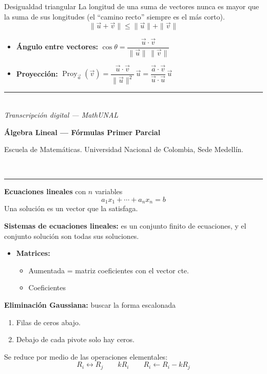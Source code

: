 \documentclass[11pt]{article}
\newcommand{\examheader}{%
  \noindent
  \begin{minipage}[t]{0.6\linewidth}
    {\small\bfseries Álgebra Lineal --- Fórmulas Primer Parcial}\\
  \end{minipage}%
  \hfill
  \begin{minipage}[t]{0.35\linewidth}
    \raggedleft\small Escuela de Matemáticas. Universidad Nacional de Colombia, Sede Medellín.
  \end{minipage}\\[2pt]
  \rule{\linewidth}{0.6pt}
}
\newcommand{\examfooter}{%
  \vfill
  \rule{\linewidth}{0.4pt}\\[1pt]
  {\scriptsize\textit{Transcripción digital --- MathUNAL}\hfill\textcolor{unalblue}{\textbf{\thepage}}}
}
\begin{document}
\begin{defbox4}{Desigualdad triangular}
La longitud de una suma de vectores nunca es mayor que la suma de sus longitudes (el ``camino recto'' siempre es el más corto).
\[
\|\vec u + \vec v\| \leq \|\vec u\| + \|\vec v\|
\]
\end{defbox4}

\vspace{0.1cm}
\begin{itemize}[leftmargin=1.2em]
\item \textbf{Ángulo entre vectores:} $\cos\theta = \dfrac{\vec u \cdot \vec v}{\|\vec u\|\,\|\vec v\|}$
\item \textbf{Proyección:} $\operatorname{Proy}_{\vec a}(\vec v) = \dfrac{\vec u \cdot \vec v}{\|\vec u\|^2}\,\vec u = \dfrac{\vec a \cdot \vec v}{\vec u \cdot \vec u}\,\vec u$
\end{itemize}

\examfooter
\newpage

\examheader

{\bfseries\color{purple1} Ecuaciones lineales} con $n$ variables
\[
a_1x_1 + \cdots + a_nx_n = b
\]
Una solución es un vector que la satisfaga.

\vspace{0.2cm}
{\bfseries\color{magenta1} Sistemas de ecuaciones lineales:} es un conjunto finito de ecuaciones, y el conjunto solución son todas sus soluciones.

\vspace{0.3cm}
\begin{itemize}[leftmargin=1.2em]
\item \textbf{Matrices:}
\begin{itemize}
\item Aumentada = matriz coeficientes con el vector cte.
\item Coeficientes
\end{itemize}
\end{itemize}

\vspace{0.2cm}
{\bfseries\color{magenta1} Eliminación Gaussiana:} buscar la forma escalonada
\begin{enumerate}
\item Filas de ceros abajo.
\item Debajo de cada pivote solo hay ceros.
\end{enumerate}
Se reduce por medio de las operaciones elementales:
\[
R_i \leftrightarrow R_j \qquad kR_i \qquad R_i \leftarrow R_i - kR_j
\]
\end{document}
